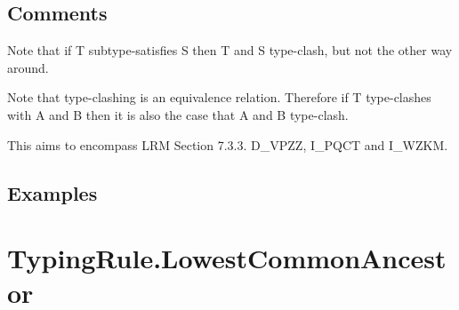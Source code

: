 \documentclass{book}
\begin{document}
\subsection{Comments}
  Note that if T subtype-satisfies S then T and S type-clash, but not the other
  way around.

  Note that type-clashing is an equivalence relation. Therefore if T
  type-clashes with A and B then it is also the case that A and B type-clash.

  This aims to encompass LRM Section 7.3.3. D\_VPZZ, I\_PQCT and I\_WZKM.

\subsection{Examples}

\section{TypingRule.LowestCommonAncestor}
\end{document}
